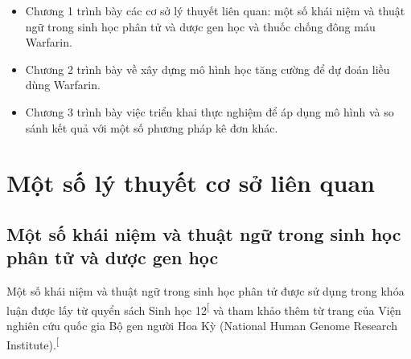 \documentclass[14pt,oneside]{scrbook}
\providecommand{\tightlist}{\setlength{\itemsep}{\smallskipamount}\setlength{\parskip}{\smallskipamount}}
\begin{document}
\begin{itemize}
\tightlist
\item
  Chương 1 trình bày các cơ sở lý thuyết liên quan: một số khái niệm và thuật ngữ trong sinh học phân tử và dược gen học và thuốc chống đông máu Warfarin.
\item
  Chương 2 trình bày về xây dựng mô hình học tăng cường để dự đoán liều dùng Warfarin.
\item
  Chương 3 trình bày việc triển khai thực nghiệm để áp dụng mô hình và so sánh kết quả với một số phương pháp kê đơn khác.
\end{itemize}

\chapter{Một số lý thuyết cơ sở liên
quan}\label{mux1ed9t-sux1ed1-luxfd-thuyux1ebft-cux1a1-sux1edf-liuxean-quan}

\section{Một số khái niệm và thuật ngữ trong sinh học phân tử và dược
gen
học}\label{mux1ed9t-sux1ed1-khuxe1i-niux1ec7m-vuxe0-thuux1eadt-ngux1eef-trong-sinh-hux1ecdc-phuxe2n-tux1eed-vuxe0-dux1b0ux1ee3c-gen-hux1ecdc}

Một số khái niệm và thuật ngữ trong sinh học phân tử được sử dụng trong
khóa luận được lấy từ quyển sách Sinh học
12\textsuperscript{{[}\citeproc{ref-sinh12}{3}{]}} và tham khảo thêm từ
trang của Viện nghiên cứu quốc gia Bộ gen người Hoa Kỳ (National Human
Genome Research
Institute).\textsuperscript{{[}\citeproc{ref-nhgri}{4}{]}}
\end{document}
